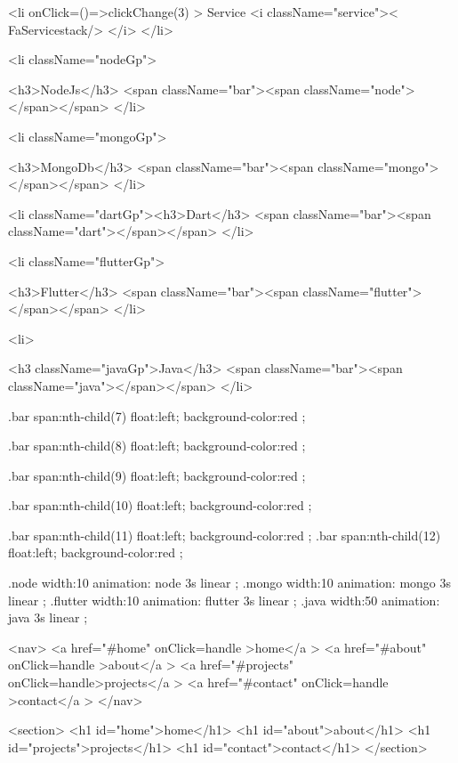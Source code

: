 <li  onClick={()=>clickChange(3)} > Service <i className="service">< FaServicestack/>     </i>   </li>



<li className="nodeGp">
  
  <h3>NodeJs</h3>
<span className="bar"><span className="node"></span></span>
</li>



<li className="mongoGp">
  
  <h3>MongoDb</h3>
<span className="bar"><span className="mongo"></span></span>
</li>


<li className="dartGp"><h3>Dart</h3>
<span className="bar"><span className="dart"></span></span>
</li>


<li className="flutterGp">
  
  <h3>Flutter</h3>
<span className="bar"><span className="flutter"></span></span>
</li>



<li>
  
  <h3 className="javaGp">Java</h3>
<span className="bar"><span className="java"></span></span>
</li>



.bar span:nth-child(7){
    float:left;
    background-color:red ;
}

.bar span:nth-child(8){
    float:left;
    background-color:red ;
}


.bar span:nth-child(9){
    float:left;
    background-color:red ;
}


.bar span:nth-child(10){
    float:left;
    background-color:red ;
}

.bar span:nth-child(11){
    float:left;
    background-color:red ;
}
.bar span:nth-child(12){
    float:left;
    background-color:red ;
}


.node{
    width:10%
    animation: node 3s linear ;
}
.mongo{
    width:10%
    animation: mongo 3s linear ;
}
.flutter{
    width:10%
    animation: flutter 3s linear ;
}
.java{
    width:50%
    animation: java 3s linear ;
}







<nav>
  <a href="#home"   onClick={handle} >home</a  >
  <a  href="#about"    onClick={handle} >about</a  >
  <a href="#projects"    onClick={handle}>projects</a  >
  <a  href="#contact"  onClick={handle} >contact</a  >
</nav>
  
  <section>
    <h1 id="home">home</h1>
    <h1 id="about">about</h1>
    <h1 id="projects">projects</h1>
    <h1 id="contact">contact</h1>
  </section>














